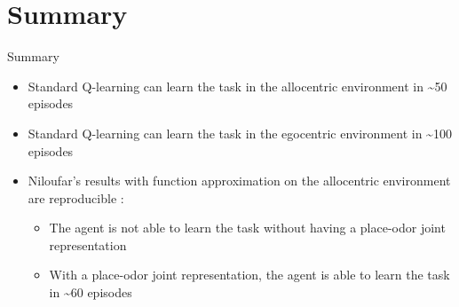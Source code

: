 \documentclass[bigger]{beamer}
\begin{document}
\section{Summary}
\label{sec:org2290226}
\begin{frame}[<+->][label={sec:orga01e917}]{Summary}
\begin{itemize}
\item Standard Q-learning can learn the task in the \alert{allocentric} environment in \textasciitilde{}50 episodes
\item Standard Q-learning can learn the task in the \alert{egocentric} environment in \textasciitilde{}100 episodes
\item Niloufar's results with function approximation on the allocentric environment are reproducible :
\begin{itemize}
\item The agent is \alert{not able to learn} the task \alert{without} having a place-odor joint representation
\item \alert{With} a place-odor joint representation, the agent is \alert{able to learn the task} in \textasciitilde{}60 episodes
\end{itemize}
\end{itemize}
\end{frame}
\end{document}

